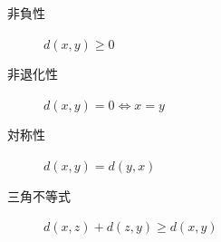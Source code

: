 \begin{description}
	\item[非負性] $d(x,y)\ge 0$
	\item[非退化性] $d(x,y)=0 \Leftrightarrow x=y$
	\item[対称性] $d(x,y)=d(y,x)$
	\item[三角不等式] $d(x,z) + d(z,y) \ge d(x,y)$
\end{description}
